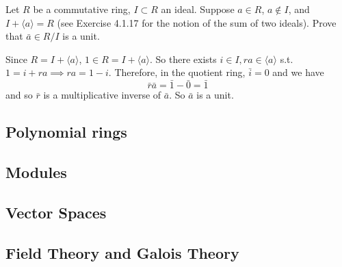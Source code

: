   \begin{exercise}[Shifrin 4.2.12]
    Let $R$ be a commutative ring, $I \subset R$ an ideal. Suppose $a \in R$, $a \notin I$, and $I + \langle a \rangle = R$ (see Exercise 4.1.17 for the notion of the sum of two ideals). Prove that $\bar{a} \in R/I$ is a unit.
  \end{exercise}
  \begin{solution}
    Since $R = I + \langle a \rangle$, $1 \in R = I + \langle a \rangle$. So there exists $i \in I, ra \in \langle a \rangle$ s.t. $1 = i + ra \implies ra = 1 - i$. Therefore, in the quotient ring, $\bar{i} = 0$ and we have 
    \begin{equation}
      \bar{r} \bar{a} = \bar{1} - \bar{0} = \bar{1}
    \end{equation}
    and so $\bar{r}$ is a multiplicative inverse of $\bar{a}$. So $\bar{a}$ is a unit. 
  \end{solution}

\subsection{Polynomial rings}

\subsection{Modules}

\subsection{Vector Spaces}

\subsection{Field Theory and Galois Theory}

